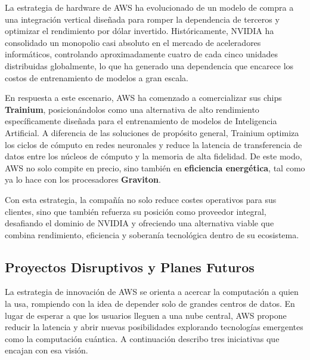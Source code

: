 \documentclass[12pt,a4paper]{article}
\begin{document}
La estrategia de hardware de AWS ha evolucionado de un modelo de compra a una integración vertical diseñada para romper la dependencia de terceros y optimizar el rendimiento por dólar invertido. Históricamente, NVIDIA ha consolidado un monopolio casi absoluto en el mercado de aceleradores informáticos, controlando aproximadamente cuatro de cada cinco unidades distribuidas globalmente, lo que ha generado una dependencia que encarece los costos de entrenamiento de modelos a gran escala.

En respuesta a este escenario, AWS ha comenzado a comercializar sus chips \textbf{Trainium}, posicionándolos como una alternativa de alto rendimiento específicamente diseñada para el entrenamiento de modelos de Inteligencia Artificial. A diferencia de las soluciones de propósito general, Trainium optimiza los ciclos de cómputo en redes neuronales y reduce la latencia de transferencia de datos entre los núcleos de cómputo y la memoria de alta fidelidad. De este modo, AWS no solo compite en precio, sino también en \textbf{eficiencia energética}, tal como ya lo hace con los procesadores \textbf{Graviton}.

Con esta estrategia, la compañía no solo reduce costes operativos para sus clientes, sino que también refuerza su posición como proveedor integral, desafiando el dominio de NVIDIA y ofreciendo una alternativa viable que combina rendimiento, eficiencia y soberanía tecnológica dentro de su ecosistema.

\subsection{Proyectos Disruptivos y Planes Futuros}

La estrategia de innovación de AWS se orienta a acercar la computación a quien la usa, rompiendo con la idea de depender solo de grandes centros de datos. En lugar de esperar a que los usuarios lleguen a una nube central, AWS propone reducir la latencia y abrir nuevas posibilidades explorando tecnologías emergentes como la computación cuántica. A continuación describo tres iniciativas que encajan con esa visión.
\end{document}
